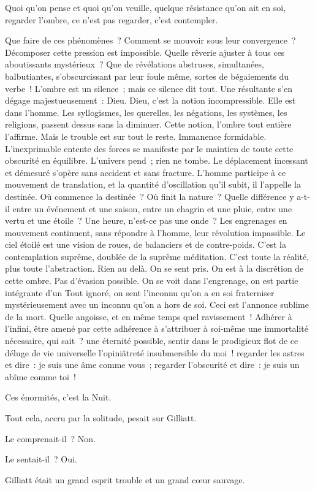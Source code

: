 \documentclass[french,twoside]{book} %
\begin{document}
Quoi qu’on pense et quoi qu’on veuille, quelque résistance qu’on ait en soi, regarder l’ombre, ce n’est pas regarder, c’est contempler.\par
Que faire de ces phénomènes ? Comment se mouvoir sous leur convergence ? Décomposer cette pression est impossible. Quelle rêverie ajuster à tous ces aboutissants mystérieux ? Que de révélations abstruses, simultanées, balbutiantes, s’obscurcissant par leur foule même, sortes de bégaiements du verbe ! L’ombre est un silence ; mais ce silence dit tout. Une résultante s’en dégage majestueusement : Dieu. Dieu, c’est la notion incompressible. Elle est dans l’homme. Les syllogismes, les querelles, les négations, les systèmes, les religions, passent dessus sans la diminuer. Cette notion, l’ombre tout entière l’affirme. Mais le trouble est sur tout le reste. Immanence formidable. L’inexprimable entente des forces se manifeste par le maintien de toute cette obscurité en équilibre. L’univers pend ; rien ne tombe. Le déplacement incessant et démesuré s’opère sans accident et sans fracture. L’homme participe à ce mouvement de translation, et la quantité d’oscillation qu’il subit, il l’appelle la destinée. Où commence la destinée ? Où finit la nature ? Quelle différence y a-t-il entre un événement et une saison, entre  un chagrin et une pluie, entre une vertu et une étoile ? Une heure, n’est-ce pas une onde ? Les engrenages en mouvement continuent, sans répondre à l’homme, leur révolution impassible. Le ciel étoilé est une vision de roues, de balanciers et de contre-poids. C’est la contemplation suprême, doublée de la suprême méditation. C’est toute la réalité, plus toute l’abstraction. Rien au delà. On se sent pris. On est à la discrétion de cette ombre. Pas d’évasion possible. On se voit dans l’engrenage, on est partie intégrante d’un Tout ignoré, on sent l’inconnu qu’on a en soi fraterniser mystérieusement avec un inconnu qu’on a hors de soi. Ceci est l’annonce sublime de la mort. Quelle angoisse, et en même temps quel ravissement ! Adhérer à l’infini, être amené par cette adhérence à s’attribuer à soi-même une immortalité nécessaire, qui sait ? une éternité possible, sentir dans le prodigieux flot de ce déluge de vie universelle l’opiniâtreté insubmersible du moi ! regarder les astres et dire : je suis une âme comme vous ; regarder l’obscurité et dire : je suis un abîme comme toi !\par
Ces énormités, c’est la Nuit.\par
Tout cela, accru par la solitude, pesait sur Gilliatt.\par
Le comprenait-il ? Non.\par
Le sentait-il ? Oui.\par
Gilliatt était un grand esprit trouble et un grand cœur sauvage.
\end{document}
